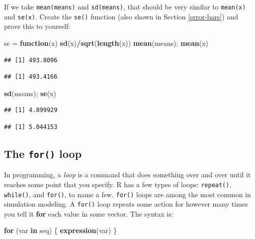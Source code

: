 \documentclass[]{book}
\newenvironment{Shaded}{\begin{snugshade}}{\end{snugshade}}
\newcommand{\KeywordTok}[1]{\textcolor[rgb]{0.13,0.29,0.53}{\textbf{#1}}}
\newcommand{\StringTok}[1]{\textcolor[rgb]{0.31,0.60,0.02}{#1}}
\newcommand{\ControlFlowTok}[1]{\textcolor[rgb]{0.13,0.29,0.53}{\textbf{#1}}}
\newcommand{\OperatorTok}[1]{\textcolor[rgb]{0.81,0.36,0.00}{\textbf{#1}}}
\newcommand{\NormalTok}[1]{#1}
\theoremstyle{definition}
\theoremstyle{definition}
\theoremstyle{definition}
\theoremstyle{remark}
\begin{document}
If we take \texttt{mean(means)} and \texttt{sd(means)}, that should be
very similar to \texttt{mean(x)} and \texttt{se(x)}. Create the
\texttt{se()} function (also shown in Section \ref{error-bars}) and
prove this to yourself:

\begin{Shaded}
\begin{Highlighting}[]
\NormalTok{se =}\StringTok{ }\ControlFlowTok{function}\NormalTok{(x) }\KeywordTok{sd}\NormalTok{(x)}\OperatorTok{/}\KeywordTok{sqrt}\NormalTok{(}\KeywordTok{length}\NormalTok{(x))}
\KeywordTok{mean}\NormalTok{(means); }\KeywordTok{mean}\NormalTok{(x)}
\end{Highlighting}
\end{Shaded}

\begin{verbatim}
## [1] 493.8096
\end{verbatim}

\begin{verbatim}
## [1] 493.4166
\end{verbatim}

\begin{Shaded}
\begin{Highlighting}[]
\KeywordTok{sd}\NormalTok{(means); }\KeywordTok{se}\NormalTok{(x)}
\end{Highlighting}
\end{Shaded}

\begin{verbatim}
## [1] 4.899929
\end{verbatim}

\begin{verbatim}
## [1] 5.044153
\end{verbatim}

\subsection{\texorpdfstring{The \texttt{for()}
loop}{The for() loop}}\label{for-loops}

In programming, a \emph{loop} is a command that does something over and
over until it reaches some point that you specify. R has a few types of
loops: \texttt{repeat()}, \texttt{while()}, and \texttt{for()}, to name
a few. \texttt{for()} loops are among the most common in simulation
modeling. A \texttt{for()} loop repeats some action for however many
times you tell it \textbf{for} each value in some vector. The syntax is:

\begin{Shaded}
\begin{Highlighting}[]
\ControlFlowTok{for}\NormalTok{ (var }\ControlFlowTok{in}\NormalTok{ seq) \{}
  \KeywordTok{expression}\NormalTok{(var)}
\NormalTok{\}}
\end{Highlighting}
\end{Shaded}
\end{document}
